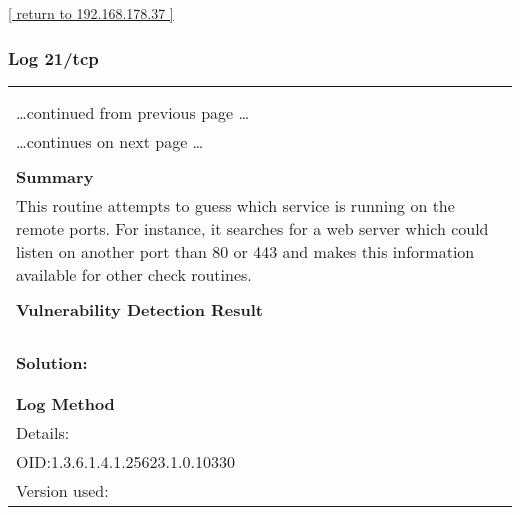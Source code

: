 \documentclass{article}
\begin{document}
\begin{footnotesize}\hyperref[host:192.168.178.37]{[ return to 192.168.178.37 ]}\end{footnotesize}
\subsubsection{Log 21/tcp}
\label{port:192.168.178.37 21/tcp Log}

\begin{longtable}{|p{}|}
\hline
\rowcolor{gvm_log}{\color{white}{Log (CVSS: 0.0) }}\\
\rowcolor{gvm_log}{\color{white}{NVT: Services}}\\
\hline
\endfirsthead
\hfill\ldots continued from previous page \ldots \\
\hline
\endhead
\hline
\ldots continues on next page \ldots \\
\endfoot
\hline
\endlastfoot
\\
\textbf{Summary}\\
This routine attempts to guess which service is running on the
  remote ports. For instance, it searches for a web server which could listen on another port than
  80 or 443 and makes this information available for other check routines.\\

        \hline
        \\
\textbf{Vulnerability Detection Result}\\
\rowcolor{white}{\verb=An FTP server is running on this port.=}\\
\rowcolor{white}{\verb=Here is its banner : =}\\
\rowcolor{white}{\verb=220 Welcome to the opendreambox FTP service!=}\\

          \hline
          \\
\textbf{Solution:}\\
\\


        \hline
        \\
\textbf{Log Method}\\
Details:
\rowcolor{white}{\verb=Services=}\\
OID:1.3.6.1.4.1.25623.1.0.10330\\
Version used:
\rowcolor{white}{\verb=2021-03-15T10:42:03Z=}\\
\end{longtable}
\end{document}

